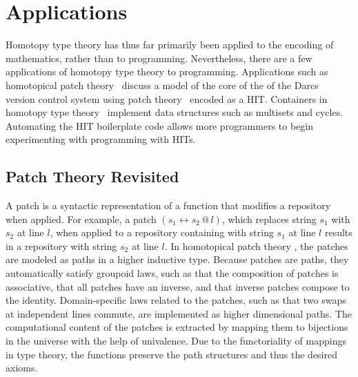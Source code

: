 \documentclass[sigplan,10pt]{acmart}
\begin{document}
\section{Applications}

Homotopy type theory has thus far primarily been applied to the encoding of mathematics, rather than to programming.
Nevertheless, there are a few  applications of homotopy type theory to programming. Applications such as homotopical patch theory~\citep{Angiuli-2014} discuss a model of the core of the of the Darcs~\citep{Darcs-2005} version control system using patch theory~\citep{Mimram-2013,Jason-2009} encoded as a HIT. Containers in homotopy type theory~\citep{Altenkirch-2014,Abbott-2005} implement data structures such as multisets and cycles. Automating the HIT boilerplate code allows more programmers to begin experimenting with programming with HITs.


\subsection{Patch Theory Revisited}
\label{patch-theory}

A patch is a syntactic representation of a function that modifies a repository when applied. For example, a patch $(s_1 \leftrightarrow s_2 \, @ \, l)$, which replaces string $s_1$ with $s_2$ at line $l$, when applied to a repository containing with string $s_1$ at line $l$ results in a repository with string $s_2$ at line $l$. In homotopical patch theory \cite{Angiuli-2014}, the patches are modeled as paths in a higher inductive type. Because patches are paths, they automatically satisfy groupoid laws, such as that the composition of patches is associative, that all patches have an inverse,  and that inverse patches compose to the identity. Domain-specific laws related to the patches, such as that two swaps at independent lines commute, are implemented as higher dimensional paths.
The computational content of the patches is extracted by mapping them to bijections in the universe with the help of univalence. Due to the functoriality of mappings in type theory, the functions preserve the path structures and thus the desired axioms.
\end{document}
